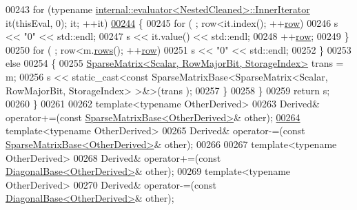 \begin{DoxyCode}
00243           \textcolor{keywordflow}{for} (\textcolor{keyword}{typename} \hyperlink{struct_eigen_1_1internal_1_1evaluator}{internal::evaluator<NestedCleaned>::InnerIterator}
       it(thisEval, 0); it; ++it)
\hyperlink{group___sparse_core___module_a4d2a17b67327925dc9dab29694f48433}{00244}           \{
00245             \textcolor{keywordflow}{for} ( ; row<it.index(); ++\hyperlink{group___sparse_core___module_ac0a5563ed3f243f013fb9d2c17e230d0}{row})
00246               s << \textcolor{stringliteral}{"0"} << std::endl;
00247             s << it.value() << std::endl;
00248             ++\hyperlink{group___sparse_core___module_ac0a5563ed3f243f013fb9d2c17e230d0}{row};
00249           \}
00250           \textcolor{keywordflow}{for} ( ; row<m.\hyperlink{group___sparse_core___module_a1944e9fa9ce7937bfc3a87b2cb94371f}{rows}(); ++\hyperlink{group___sparse_core___module_ac0a5563ed3f243f013fb9d2c17e230d0}{row})
00251             s << \textcolor{stringliteral}{"0"} << std::endl;
00252         \}
00253         \textcolor{keywordflow}{else}
00254         \{
00255           \hyperlink{group___sparse_core___module_class_eigen_1_1_sparse_matrix}{SparseMatrix<Scalar, RowMajorBit, StorageIndex>} 
      trans = m;
00256           s << static\_cast<const SparseMatrixBase<SparseMatrix<Scalar, RowMajorBit, StorageIndex> >&>(trans
      );
00257         \}
00258       \}
00259       \textcolor{keywordflow}{return} s;
00260     \}
00261 
00262     \textcolor{keyword}{template}<\textcolor{keyword}{typename} OtherDerived>
00263     Derived& operator+=(\textcolor{keyword}{const} \hyperlink{group___sparse_core___module_class_eigen_1_1_sparse_matrix_base}{SparseMatrixBase<OtherDerived>}& other);
\hyperlink{group___sparse_core___module_aa531aefed8ea1fa530c638abc8eea6c9}{00264}     \textcolor{keyword}{template}<\textcolor{keyword}{typename} OtherDerived>
00265     Derived& operator-=(\textcolor{keyword}{const} \hyperlink{group___sparse_core___module_class_eigen_1_1_sparse_matrix_base}{SparseMatrixBase<OtherDerived>}& other);
00266     
00267     \textcolor{keyword}{template}<\textcolor{keyword}{typename} OtherDerived>
00268     Derived& operator+=(\textcolor{keyword}{const} \hyperlink{class_eigen_1_1_diagonal_base}{DiagonalBase<OtherDerived>}& other);
00269     \textcolor{keyword}{template}<\textcolor{keyword}{typename} OtherDerived>
00270     Derived& operator-=(\textcolor{keyword}{const} \hyperlink{class_eigen_1_1_diagonal_base}{DiagonalBase<OtherDerived>}& other);

\end{DoxyCode}
